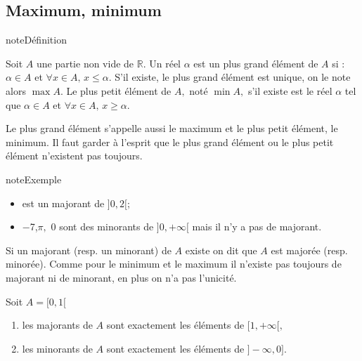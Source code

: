 \documentclass[letterpaper,10pt,french]{jupyterBook}
\begin{document}
\subsection{Maximum, minimum}
\label{\detokenize{proprties:maximum-minimum}}
\begin{sphinxadmonition}{note}{Définition}

\sphinxAtStartPar
Soit \(A\) une partie non vide de \(\mathbb{R}.\) Un réel \(\alpha\) est un plus grand élément de \(A\) si :
\(\alpha\in A\) et \(\forall x\in A,\,x\leqslant \alpha.\)
S’il existe, le plus grand élément est unique, on le note alors \(\max A.\)
Le plus petit élément de \(A,\) noté \(\min A,\) s’il existe est le réel \(\alpha\) tel que \(\alpha\in A\) et \(\forall x\in A, \,x\geqslant \alpha.\)

\sphinxAtStartPar
Le plus grand élément s’appelle aussi le maximum et le plus petit élément, le minimum. Il faut garder à l’esprit que
le plus grand élément ou le plus petit élément n’existent pas toujours.
\end{sphinxadmonition}

\begin{sphinxadmonition}{note}{Exemple}
\begin{itemize}
\item {} 
 est un majorant de \(]0, 2[ ;\)

\item {} 
\sphinxAtStartPar
−7,\(\pi,\) 0 sont des minorants de \(]0,+\infty[\) mais il n’y a pas de majorant.

\end{itemize}

\sphinxAtStartPar
Si un majorant (resp. un minorant) de \(A\) existe on dit que \(A\) est majorée (resp. minorée).
Comme pour le minimum et le maximum il n’existe pas toujours de majorant ni de minorant, en plus on n’a pas
l’unicité.

\sphinxAtStartPar
Soit \(A =[0,1[\)
\begin{enumerate}
%
\item {} 
\sphinxAtStartPar
les majorants de \(A\) sont exactement les éléments de \([1,+\infty[,\)

\item {} 
\sphinxAtStartPar
les minorants de \(A\) sont exactement les éléments de \(]−\infty,0].\)

\end{enumerate}
\end{sphinxadmonition}
\end{document}

